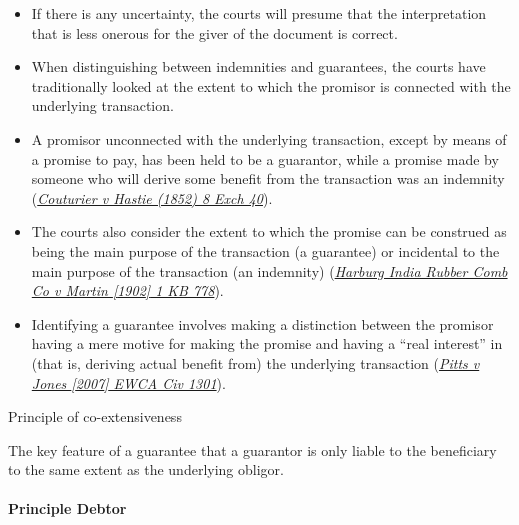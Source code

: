 \documentclass[
]{article}
\providecommand{\tightlist}{%
  \setlength{\itemsep}{0pt}\setlength{\parskip}{0pt}}
\newenvironment{env-8872a5c8-2356-4b38-87ff-b8a967f137b3}
{
    \savenotes\tcolorbox[blanker,breakable,left=5pt,borderline west={2pt}{-4pt}{yellow}]
}
{
    \endtcolorbox\spewnotes
}
\begin{document}
\begin{itemize}
\tightlist
\item
  If there is any uncertainty, the courts will presume that the
  interpretation that is less onerous for the giver of the document is
  correct.
\item
  When distinguishing between indemnities and guarantees, the courts
  have traditionally looked at the extent to which the promisor is
  connected with the underlying transaction.
\item
  A promisor unconnected with the underlying transaction, except by
  means of a promise to pay, has been held to be a guarantor, while a
  promise made by someone who will derive some benefit from the
  transaction was an indemnity
  (\emph{\href{https://uk.westlaw.com/D-000-4146?originationContext=document\&transitionType=PLDocumentLink\&contextData=(sc.Default)\&ppcid=31b1b10b11a346b28acbfa5d800fec19}{Couturier
  v Hastie (1852) 8 Exch 40}}).
\item
  The courts also consider the extent to which the promise can be
  construed as being the main purpose of the transaction (a guarantee)
  or incidental to the main purpose of the transaction (an indemnity)
  (\emph{\href{https://uk.westlaw.com/D-000-5044?originationContext=document\&transitionType=PLDocumentLink\&contextData=(sc.Default)\&ppcid=31b1b10b11a346b28acbfa5d800fec19}{Harburg
  India Rubber Comb Co v Martin {[}1902{]} 1 KB 778}}).
\item
  Identifying a guarantee involves making a distinction between the
  promisor having a mere motive for making the promise and having a
  ``real interest'' in (that is, deriving actual benefit from) the
  underlying transaction
  (\emph{\href{https://uk.westlaw.com/D-000-2980?originationContext=document\&transitionType=PLDocumentLink\&contextData=(sc.Default)\&ppcid=31b1b10b11a346b28acbfa5d800fec19}{Pitts
  v Jones {[}2007{]} EWCA Civ 1301}}).
\end{itemize}

\begin{env-8872a5c8-2356-4b38-87ff-b8a967f137b3}

Principle of co-extensiveness

The key feature of a guarantee that a guarantor is only liable to the
beneficiary to the same extent as the underlying obligor.

\end{env-8872a5c8-2356-4b38-87ff-b8a967f137b3}

\hypertarget{principle-debtor}{%
\paragraph{Principle Debtor}\label{principle-debtor}}
\end{document}
